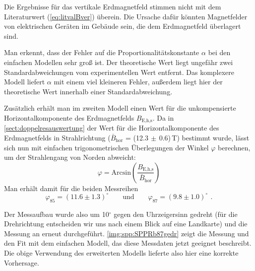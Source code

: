 Die Ergebnisse für das vertikale Erdmagnetfeld stimmen nicht mit dem Literaturwert (\autoref{eq:litvalBver}) überein.
Die Ursache dafür könnten Magnetfelder von elektrischen Geräten im Gebäude sein,
die dem Erdmagnetfeld überlagert sind.

Man erkennt, dass der Fehler auf die Proportionalitätskonstante $\alpha$ bei den einfachen Modellen sehr groß ist.
Der theoretische Wert liegt ungefähr zwei Standardabweichungen vom experimentellen Wert entfernt.
Das komplexere Modell liefert $\alpha$ mit einem viel kleineren Fehler,
außerdem liegt hier der theoretische Wert innerhalb
einer Standardabweichung.

Zusätzlich erhält man im zweiten Modell einen Wert für die unkompensierte Horizontalkomponente des Erdmagnetfelds $B_\text{E,h,s}$.
Da in \autoref{sect:doppelresauswertung} der Wert für die Horizontalkomponente des Erdmagnetfelds in
Strahlrichtung ($\bar{B}_\text{hor}$ = (12.3$\,\pm\,$0.6)\,\textmu T) bestimmt wurde,
lässt sich nun mit einfachen trigonometrischen Überlegungen der Winkel $\varphi$ berechnen,
um der Strahlengang von Norden abweicht:
\begin{equation}
  \varphi = \text{Arcsin}\left( \frac{B_\text{E,h,s}}{\bar{B}_\text{hor}} \right)
\end{equation}
Man erhält damit für die beiden Messreihen
\begin{equation}
  \varphi_{85} = (11.6 \pm 1.3)^\circ \qquad \text{und} \qquad \varphi_{87} = (9.8 \pm 1.0)^\circ \ \, .
\end{equation}

Der Messaufbau wurde also um 10$^\circ$ gegen den Uhrzeigersinn gedreht
(für die Drehrichtung entscheiden wir uns nach einem Blick auf eine Landkarte)
und die Messung an  erneut durchgeführt.
\autoref{img:spp:SPPRb87gedr} zeigt die Messung und den Fit mit dem einfachen Modell,
das diese Messdaten jetzt geeignet beschreibt.
Die obige Verwendung des erweiterten Modells lieferte also hier eine korrekte Vorhersage.


